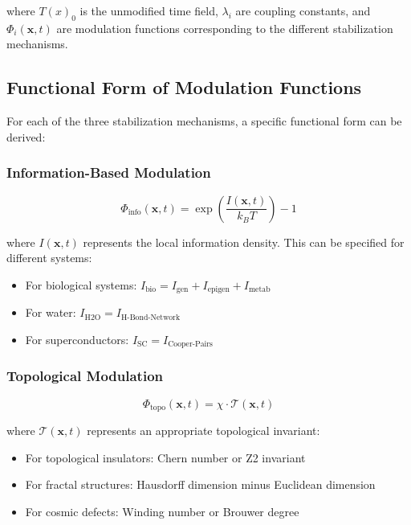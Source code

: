 \documentclass[12pt,a4paper]{article}
\newcommand{\Tfield}{T(x)}
\begin{document}
	where $\Tfield_0$ is the unmodified time field, $\lambda_i$ are coupling constants, and $\Phi_i(\mathbf{x}, t)$ are modulation functions corresponding to the different stabilization mechanisms.
	
	\subsection{Functional Form of Modulation Functions}
	\label{subsec:modulationsfunktionen}
	
	For each of the three stabilization mechanisms, a specific functional form can be derived:
	
	\subsubsection{Information-Based Modulation}
	\label{subsubsec:info_modulation}
	
	\begin{equation}
		\Phi_{\text{info}}(\mathbf{x}, t) = \exp\left(\frac{I(\mathbf{x}, t)}{k_B T}\right) - 1
	\end{equation}
	
	where $I(\mathbf{x}, t)$ represents the local information density. This can be specified for different systems:
	
	\begin{itemize}
		\item For biological systems: $I_{\text{bio}} = I_{\text{gen}} + I_{\text{epigen}} + I_{\text{metab}}$
		\item For water: $I_{\text{H2O}} = I_{\text{H-Bond-Network}}$
		\item For superconductors: $I_{\text{SC}} = I_{\text{Cooper-Pairs}}$
	\end{itemize}
	
	\subsubsection{Topological Modulation}
	\label{subsubsec:topo_modulation}
	
	\begin{equation}
		\Phi_{\text{topo}}(\mathbf{x}, t) = \chi \cdot \mathcal{T}(\mathbf{x}, t)
	\end{equation}
	
	where $\mathcal{T}(\mathbf{x}, t)$ represents an appropriate topological invariant:
	
	\begin{itemize}
		\item For topological insulators: Chern number or Z2 invariant
		\item For fractal structures: Hausdorff dimension minus Euclidean dimension
		\item For cosmic defects: Winding number or Brouwer degree
	\end{itemize}
	
\end{document}
